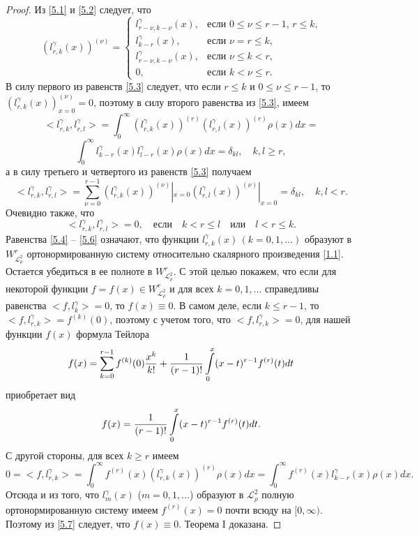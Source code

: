 \begin{proof}
Из \eqref{5.1} и \eqref{5.2} следует, что
 \begin{equation}\label{5.3}
(l^\gamma_{r,k}(x))^{(\nu)} =\begin{cases}l^\gamma_{r-\nu,k-\nu}(x),&\text{если $0\le\nu\le r-1$, $r\le k$,}\\
l^\gamma_{k-r}(x),&\text{если  $\nu=r\le k$,}\\
l^\gamma_{r-\nu,k-\nu}(x),&\text{если $\nu\le k< r$,}\\
0,&\text{если $k< \nu\le r$}.
  \end{cases}
\end{equation}
В силу первого из равенств  \eqref{5.3} следует, что если $r\le k$ и $0\le\nu\le r-1$, то  $(l^\gamma_{r,k}(x))^{(\nu)}_{x=0}=0$, поэтому
в силу второго равенства из  \eqref{5.3},  имеем
$$
<l^\gamma_{r,k},l^\gamma_{r,l}>= \int_{0}^\infty(l^\gamma_{r,k}(x))^{(r)}(l^\gamma_{r,l}(x))^{(r)}\rho(x) dx=
$$
\begin{equation}\label{5.4}
    \int_{0}^\infty l^\gamma_{k-r}(x)l^\gamma_{l-r}(x)\rho(x) dx=\delta_{kl},
    \quad k,l\ge r,
  \end{equation}
 а в силу третьего  и четвертого из равенств  \eqref{5.3} получаем
\begin{equation}\label{5.5}
  <l^\gamma_{r,k},l^\gamma_{r,l}>=
  \sum_{\nu=0}^{r-1}(l^\gamma_{r,k}(x))^{(\nu)}|_{x=0}
  (l^\gamma_{r,l}(x))^{(\nu)}|_{x=0}=\delta_{kl},\quad k,l< r.
  \end{equation}
  Очевидно также, что
  \begin{equation}\label{5.6}
  <l^\gamma_{r,k},l^\gamma_{r,l}>=0,\quad \text{если}\quad k< r\le l\quad \text{или} \quad l< r\le k.
  \end{equation}
 Равенства \eqref{5.4} -- \eqref{5.6}  означают, что функции  $l^\gamma_{r,k}(x)\, (k=0,1,\ldots) $ образуют   в $W^r_{\mathcal{ L}^2_\rho}$ ортонормированную  систему относительно скалярного произведения \eqref{1.1}.  Остается убедиться в ее полноте в $W^r_{\mathcal{ L}^2_\rho}$. С этой целью покажем, что если для некоторой функции $f=f(x)\in W^r_{\mathcal{ L}^2_\rho}$ и для  всех $k=0,1,\ldots$ справедливы равенства $<f,l^\gamma_k>=0$, то $f(x)\equiv0$. В самом деле, если $k\le r-1$, то  $<f,l^\gamma_{r,k}>=f^{(k)}(0)$, поэтому с учетом того, что $<f,l^\gamma_{r,k}>=0$,  для нашей функции  $f(x)$ формула Тейлора
 \begin{equation*}
f(x)=\sum_{k=0}^{r-1} f^{(k)}(0)\frac{x^k}{k!}+{1\over (r-1)!}\int\limits_{0}^x(x-t)^{r-1} f^{(r)}(t)dt
     \end{equation*}
 приобретает вид
\begin{equation}\label{5.7}
f(x)={1\over (r-1)!}\int\limits_{0}^x(x-t)^{r-1} f^{(r)}(t)dt.
     \end{equation}
С другой стороны, для всех $k\ge r$ имеем
$$
 0= <f,l^\gamma_{r,k}>=\int_{0}^\infty f^{(r)}(x) (l^\gamma_{r,k}(x))^{(r)}\rho(x) dx=
  \int_{0}^\infty f^{(r)}(x)l^\gamma_{k-r}(x) \rho(x) dx .
$$
Отсюда и из того, что $l^\gamma_m(x)$ ($m=0,1,\ldots$)  образуют в $\mathcal{ L}^2_{\rho}$ полную ортонормированную систему имеем $f^{(r)}(x)=0$ почти всюду на $[0,\infty)$. Поэтому из \eqref{5.7} следует, что   $f(x)\equiv0$. Теорема I доказана.


\end{proof}
